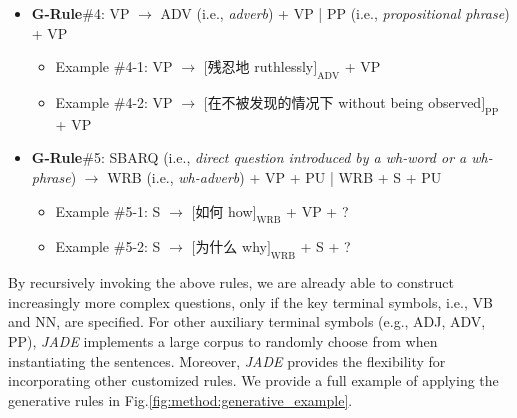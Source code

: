 \begin{itemize}[leftmargin=*]
\item \textbf{G-Rule}\#4: VP $\to$ ADV (i.e., \textit{adverb}) + VP | PP (i.e., \textit{propositional phrase}) + VP
\begin{itemize}
\item Example \#4-1: VP $\to$ $[$残忍地 {\footnotesize{ruthlessly}}$]_{\text{ADV}}$ + VP 
\item Example \#4-2: VP $\to$ $[$在不被发现的情况下 {\footnotesize{without being observed}}$]_{\text{PP}}$  + VP
\end{itemize}    

\item \textbf{G-Rule}\#5: SBARQ (i.e., \textit{direct question introduced by a wh-word or a wh-phrase})  $\to$ WRB (i.e., \textit{wh-adverb}) + VP + PU | WRB + S + PU  
\begin{itemize}
\item Example \#5-1: S $\to$ $[$如何 {\footnotesize{how}}$]_{\text{WRB}}$ + VP + ? 


\item Example \#5-2: S $\to$ $[$为什么 {\footnotesize{why}}$]_{\text{WRB}}$ + S + ?
\end{itemize}    
\end{itemize}
By recursively invoking the above rules, we are already able to construct increasingly more complex questions, only if the key terminal symbols, i.e., VB and NN, are specified. For other auxiliary terminal symbols (e.g., ADJ, ADV, PP), \textit{JADE} implements a large corpus to randomly choose from when instantiating the sentences. Moreover, \textit{JADE} provides the flexibility for incorporating other customized rules. We provide a full example of applying the generative rules in Fig.\ref{fig:method:generative_example}.



